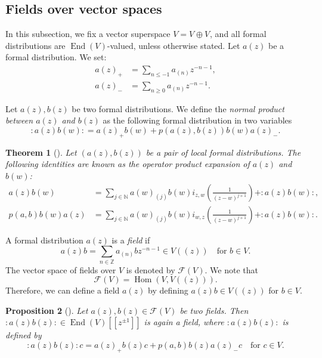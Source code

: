 \documentclass[a4paper, 12pt, reqno]{amsart}
\newtheorem{theorem}{Theorem}[section]
\newtheorem{proposition}[theorem]{Proposition}
\theoremstyle{remark}
\DeclareMathOperator{\End}{End}
\DeclareMathOperator{\zero}{\overline{0}}
\DeclareMathOperator{\one}{\overline{1}}
\DeclareMathOperator{\Hom}{Hom}
\begin{document}
\subsection{Fields over vector spaces}
\label{sec:fields-over-vector}

In this subsection, we fix a vector superspace $V = V_{\zero} \oplus V_{\one}$, and all formal distributions are $\End(V)$-valued, unless otherwise stated.
Let $a(z)$ be a formal distribution.
We set:
\begin{align*}
  a(z)_+ &= \sum_{n \le -1}a_{(n)}z^{-n - 1}, \\
  a(z)_- &= \sum_{n \ge 0}a_{(n)}z^{-n - 1}.
\end{align*}

Let $a(z), b(z)$ be two formal distributions.
We define the \emph{normal product between $a(z)$ and $b(z)$} as the following formal distribution in two variables
\begin{equation*}
  :a(z)b(w): = a(z)_+b(w) + p(a(z), b(z))b(w)a(z)_-.
\end{equation*}

\begin{theorem}[{\cite[Proposition 3.2.3]{nozaradan_introduction_2008}}]
  \label{thr:11}
  Let $(a(z), b(z))$ be a pair of local formal distributions.
  The following identities are known as the operator product expansion of $a(z)$ and $b(w)$:
  \begin{align*}
    a(z)b(w) &= \sum_{j \in \mathbb{N}}a(w)_{(j)}b(w)i_{z, w}\left(\frac{1}{(z - w)^{j + 1}}\right) + :a(z)b(w):, \\
    p(a, b)b(w)a(z) &= \sum_{j \in \mathbb{N}}a(w)_{(j)}b(w)i_{w, z}\left(\frac{1}{(z - w)^{j + 1}}\right) + :a(z)b(w):.
  \end{align*}
\end{theorem}

A formal distribution $a(z)$ is a \emph{field} if
\begin{equation*}
  a(z)b = \sum_{n \in \mathbb{Z}}a_{(n)}bz^{-n - 1} \in V((z)) \quad \text{for $b \in V$}.
\end{equation*}
The vector space of fields over $V$ is denoted by $\mathcal{F}(V)$.
We note that
\begin{equation*}
  \mathcal{F}(V) = \Hom(V, V((z))).
\end{equation*}
Therefore, we can define a field $a(z)$ by defining $a(z)b \in V((z))$ for $b \in V$.

\begin{proposition}[{\cite[Proposition 3.3.2]{nozaradan_introduction_2008}}]
  \label{prp:6}
  Let $a(z), b(z) \in \mathcal{F}(V)$ be two fields.
  Then $:a(z)b(z): \in \End(V)[[z^{\pm1}]]$ is again a field, where $:a(z)b(z):$ is defined by
  \begin{equation*}
    :a(z)b(z):c = a(z)_+b(z)c + p(a, b)b(z)a(z)_-c \quad \text{for $c \in V$}.
  \end{equation*}
\end{proposition}
\end{document}
